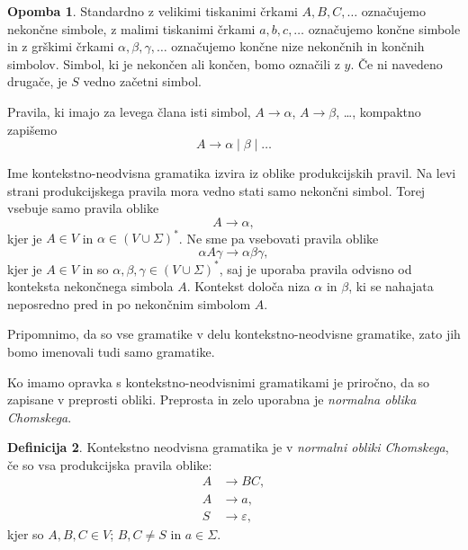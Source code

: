 \documentclass{amsart}
\theoremstyle{definition}
\newtheorem{definicija}{Definicija}[section]
\newtheorem{opomba}[definicija]{Opomba}
\theoremstyle{plain} %
\begin{document}
\begin{opomba}

    Standardno z velikimi tiskanimi črkami $ A, B, C, \ldots $ označujemo nekončne simbole,
    z malimi tiskanimi črkami $ a, b, c, \ldots $ označujemo končne simbole in
    z grškimi črkami $ \alpha, \beta, \gamma, \ldots $ označujemo končne nize
    nekončnih in končnih simbolov. Simbol, ki je nekončen ali končen, bomo označili z $y$.
    Če ni navedeno drugače, je $S$ vedno začetni simbol.

    Pravila, ki imajo za levega člana isti simbol, $ A \rightarrow \alpha $, $ A \rightarrow \beta $, \ldots,
    kompaktno zapišemo
    \[
        A \rightarrow \alpha \mid \beta \mid \ldots
    \]
    
    Ime kontekstno-neodvisna gramatika izvira iz oblike produkcijskih pravil. Na levi
    strani produkcijskega pravila mora vedno stati samo nekončni simbol. Torej vsebuje samo
    pravila oblike
    \[
        A \rightarrow \alpha,
    \]
    kjer je  $ A \in V $ in $ \alpha \in ( V \cup \Sigma )^* $. Ne sme pa vsebovati
    pravila oblike
    \[
        \alpha A \gamma \rightarrow \alpha\beta\gamma,
    \]
    kjer je $ A \in V $ in so $ \alpha, \beta, \gamma \in ( V \cup \Sigma )^* $, saj je uporaba
    pravila odvisno od konteksta nekončnega simbola $ A $. Kontekst določa niza $ \alpha $ in $ \beta $,
    ki se nahajata neposredno pred in po nekončnim simbolom $ A $.

    Pripomnimo, da so vse gramatike v delu kontekstno-neodvisne gramatike, zato jih bomo imenovali tudi
    samo gramatike.

\end{opomba}

Ko imamo opravka s kontekstno-neodvisnimi gramatikami je priročno, da so zapisane v preprosti
obliki. Preprosta in zelo uporabna je \textit{normalna oblika Chomskega}.

\begin{definicija}

    Kontekstno neodvisna gramatika je v \textit{normalni obliki Chomskega}, če so vsa produkcijska pravila oblike:
    \begin{align*}
        A &\rightarrow BC, \\
        A &\rightarrow a, \\
        S &\rightarrow \varepsilon,
    \end{align*}
    kjer so $ A, B, C \in V $; $ B, C \neq S $ in $ a \in \Sigma $.

\end{definicija}
\end{document}
